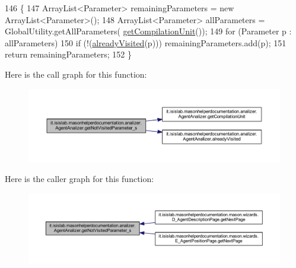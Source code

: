 \begin{DoxyCode}
146                                                           \{
147         ArrayList<Parameter> remainingParameters = \textcolor{keyword}{new} ArrayList<Parameter>();
148         ArrayList<Parameter> allParameters = GlobalUtility.getAllParameters(
      \hyperlink{classit_1_1isislab_1_1masonhelperdocumentation_1_1analizer_1_1_agent_analizer_af956b9fdd9d6b6b97d4982cba816d441}{getCompilationUnit}());
149         \textcolor{keywordflow}{for} (Parameter p : allParameters)
150             \textcolor{keywordflow}{if} (!(\hyperlink{classit_1_1isislab_1_1masonhelperdocumentation_1_1analizer_1_1_agent_analizer_a6be22d4f751e44b18796b10767b581d5}{alreadyVisited}(p))) remainingParameters.add(p); 
151         \textcolor{keywordflow}{return} remainingParameters;
152     \}
\end{DoxyCode}


Here is the call graph for this function\-:
\nopagebreak
\begin{figure}[H]
\begin{center}
\leavevmode
\includegraphics[width=350pt]{classit_1_1isislab_1_1masonhelperdocumentation_1_1analizer_1_1_agent_analizer_a9fdb36c2a505d7ad2459d70f413216d0_cgraph}
\end{center}
\end{figure}




Here is the caller graph for this function\-:
\nopagebreak
\begin{figure}[H]
\begin{center}
\leavevmode
\includegraphics[width=350pt]{classit_1_1isislab_1_1masonhelperdocumentation_1_1analizer_1_1_agent_analizer_a9fdb36c2a505d7ad2459d70f413216d0_icgraph}
\end{center}
\end{figure}


